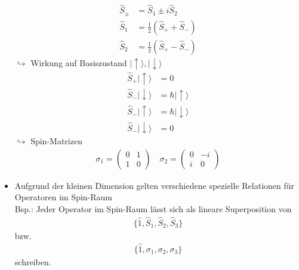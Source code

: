 \documentclass[10pt,article,colorback,accentcolor=tud9d]{scrartcl}
\begin{document}
\begin{itemize}
    \begin{align}
    \hat{S}_\pm&=\hat{S}_1\pm i\hat{S}_2\\
    \hat{S}_1&=\frac{1}{2}(\hat{S}_++\hat{S}_-)\\
    \hat{S}_2&=\frac{1}{2}(\hat{S}_+-\hat{S}_-)
    \end{align}
    $\hookrightarrow$ Wirkung auf Basiszustand $|\uparrow\rangle,|\downarrow\rangle$
    \begin{align}
    \hat{S}_+|\uparrow\rangle&=0 \\ \hat{S}_-|\downarrow\rangle&=\hbar|\uparrow\rangle\\
    \hat{S}_-|\uparrow\rangle&=\hbar|\downarrow\rangle \\ \hat{S}_-|\downarrow\rangle&=0
    \end{align}
    $\hookrightarrow$ Spin-Matrizen
    \begin{align}
    \sigma_1=\left(\begin{matrix}
    0 & 1\\ 
    1 &  0
    \end{matrix}\right)\quad
    \sigma_2=\left(\begin{matrix}
    0 & -i\\ 
    i &  0
    \end{matrix}\right)
    \end{align}
  \item Aufgrund der kleinen Dimension gelten verschiedene spezielle Relationen für Operatoren im Spin-Raum\\
    Bsp.: Jeder Operator im Spin-Raum lässt sich als lineare Superposition von 
    \begin{align}
    \{\hat{1},\hat{S}_1,\hat{S}_2,\hat{S}_3\}
    \end{align}
    bzw.
    \begin{align}
    \{\hat{1},\sigma_1,\sigma_2,\sigma_3\}
    \end{align}
    schreiben.
\end{itemize}
\end{document}
